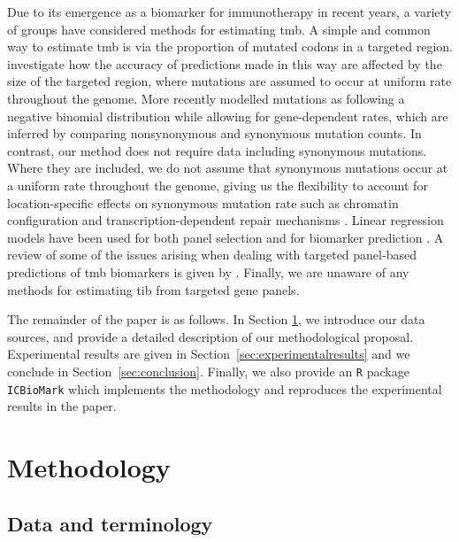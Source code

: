 \documentclass[12pt]{article}
\begin{document}
Due to its emergence as a biomarker for immunotherapy in recent years, a variety of groups have considered methods for estimating \gls{tmb}. A simple and common way to estimate \gls{tmb} is via the proportion of mutated codons in a targeted region. \citet{budczies_optimizing_2019} investigate how the accuracy of predictions made in this way are affected by the size of the targeted region, where mutations are assumed to occur at uniform rate throughout the genome. More recently \citet{yao_ectmb_2020} modelled mutations as following a negative binomial distribution while allowing for gene-dependent rates, which are inferred by comparing nonsynonymous and synonymous mutation counts. In contrast, our method does not require data including synonymous mutations. Where they are included, we do not assume that synonymous mutations occur at a uniform rate throughout the genome, giving us the flexibility to account for location-specific effects on synonymous mutation rate such as chromatin configuration \citep{makova_effects_2015} and transcription-dependent repair mechanisms \citep{fong_intertwined_2013}. Linear regression models have been used for both panel selection \citep{lyu_mutation_2018} and for biomarker prediction \citep{guo_exon_2020}. A review of some of the issues arising when dealing with targeted panel-based predictions of \gls{tmb} biomarkers is given by \citet{wu_designing_2019}. Finally, we are unaware of any methods for estimating \gls{tib} from targeted gene panels. 

The remainder of the paper is as follows. In Section \ref{sec:methodology}, we introduce our data sources, and provide a detailed description of our methodological proposal. Experimental results are given in Section~\ref{sec:experimentalresults} and we conclude in Section~\ref{sec:conclusion}.  Finally, we also provide an \texttt{R} package \texttt{ICBioMark} \citep{bradley_icbiomark_2021} which implements the methodology and reproduces the experimental results in the paper. 




\section{Methodology}
\label{sec:methodology}
\subsection{Data and terminology \label{sec:dataterminology}}
\end{document}
